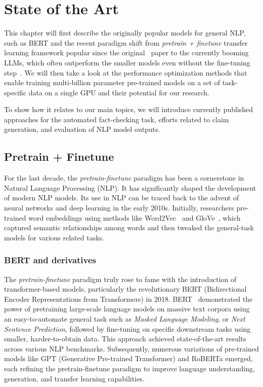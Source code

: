 
\chapter{State of the Art}

This chapter will first describe the originally popular models for general NLP, such as BERT and the recent paradigm shift from \textit{pretrain + finetune} transfer learning framework popular since the original~\cite{devlin2019bert} paper to the currently booming LLMs, which often outperform the smaller models even without the fine-tuning step~\cite{gpt4, llama, vicuna}. We will then take a look at the performance optimization methods that enable training multi-billion parameter pre-trained models on a set of task-specific data on a single GPU and their potential for our research. 

To show how it relates to our main topics, we will introduce currently published approaches for the automated fact-checking task, efforts related to claim generation, and evaluation of NLP model outputs.

\label{chap:sota}
\section{Pretrain + Finetune}
\label{sec:pretrain}
For the last decade, the \textit{pretrain-finetune} paradigm has been a cornerstone in Natural Language Processing (NLP). It has significantly shaped the development of modern NLP models. Its use in NLP can be traced back to the advent of neural networks and deep learning in the early 2010s. Initially, researchers pre-trained word embeddings using methods like Word2Vec~\cite{mikolov} and GloVe~\cite{pennington-etal-2014-glove}, which captured semantic relationships among words and then tweaked the general-task models for various related tasks.

\subsection{BERT and derivatives}\label{sec:bert}
The \textit{pretrain-finetune} paradigm truly rose to fame with the introduction of transformer-based models, particularly the revolutionary BERT (Bidirectional Encoder Representations from Transformers) in 2018. BERT~\cite{devlin2019bert} demonstrated the power of pretraining large-scale language models on massive text corpora using an easy-to-automate general task such as \textit{Masked Language Modeling}, or \textit{Next Sentence Prediction}, followed by fine-tuning on specific downstream tasks using smaller, harder-to-obtain data. This approach achieved state-of-the-art results across various NLP benchmarks. Subsequently, numerous variations of pre-trained models like GPT (Generative Pre-trained Transformer) and RoBERTa emerged, each refining the pretrain-finetune paradigm to improve language understanding, generation, and transfer learning capabilities. 


